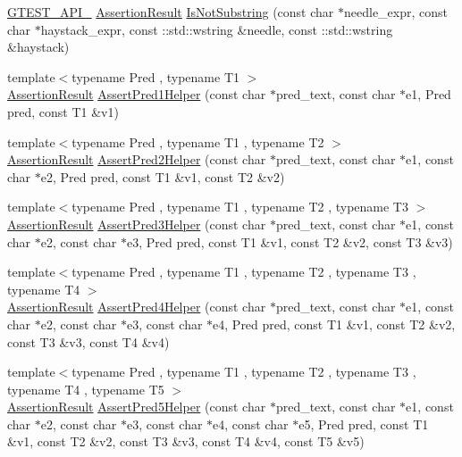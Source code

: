 \begin{DoxyCompactItemize}
\item 
\hyperlink{gtest-port_8h_aa73be6f0ba4a7456180a94904ce17790}{G\-T\-E\-S\-T\-\_\-\-A\-P\-I\-\_\-} \hyperlink{classtesting_1_1_assertion_result}{Assertion\-Result} \hyperlink{namespacetesting_a2205435db77abd191fb8209bba41862a}{Is\-Not\-Substring} (const char $\ast$needle\-\_\-expr, const char $\ast$haystack\-\_\-expr, const \-::std\-::wstring \&needle, const \-::std\-::wstring \&haystack)
\item 
{\footnotesize template$<$typename Pred , typename T1 $>$ }\\\hyperlink{classtesting_1_1_assertion_result}{Assertion\-Result} \hyperlink{namespacetesting_a7f73180474723be6e92185d6fa9e7c9f}{Assert\-Pred1\-Helper} (const char $\ast$pred\-\_\-text, const char $\ast$e1, Pred pred, const T1 \&v1)
\item 
{\footnotesize template$<$typename Pred , typename T1 , typename T2 $>$ }\\\hyperlink{classtesting_1_1_assertion_result}{Assertion\-Result} \hyperlink{namespacetesting_aa6587938029dd8733ecb885068f08247}{Assert\-Pred2\-Helper} (const char $\ast$pred\-\_\-text, const char $\ast$e1, const char $\ast$e2, Pred pred, const T1 \&v1, const T2 \&v2)
\item 
{\footnotesize template$<$typename Pred , typename T1 , typename T2 , typename T3 $>$ }\\\hyperlink{classtesting_1_1_assertion_result}{Assertion\-Result} \hyperlink{namespacetesting_ac92dcbd00a0ffb2913e65d286e321a22}{Assert\-Pred3\-Helper} (const char $\ast$pred\-\_\-text, const char $\ast$e1, const char $\ast$e2, const char $\ast$e3, Pred pred, const T1 \&v1, const T2 \&v2, const T3 \&v3)
\item 
{\footnotesize template$<$typename Pred , typename T1 , typename T2 , typename T3 , typename T4 $>$ }\\\hyperlink{classtesting_1_1_assertion_result}{Assertion\-Result} \hyperlink{namespacetesting_ae90c778d69db4682e8fd8baaa0a9f9cd}{Assert\-Pred4\-Helper} (const char $\ast$pred\-\_\-text, const char $\ast$e1, const char $\ast$e2, const char $\ast$e3, const char $\ast$e4, Pred pred, const T1 \&v1, const T2 \&v2, const T3 \&v3, const T4 \&v4)
\item 
{\footnotesize template$<$typename Pred , typename T1 , typename T2 , typename T3 , typename T4 , typename T5 $>$ }\\\hyperlink{classtesting_1_1_assertion_result}{Assertion\-Result} \hyperlink{namespacetesting_addcf52b273ce17269cbf4956cfe600a6}{Assert\-Pred5\-Helper} (const char $\ast$pred\-\_\-text, const char $\ast$e1, const char $\ast$e2, const char $\ast$e3, const char $\ast$e4, const char $\ast$e5, Pred pred, const T1 \&v1, const T2 \&v2, const T3 \&v3, const T4 \&v4, const T5 \&v5)

\end{DoxyCompactItemize}
